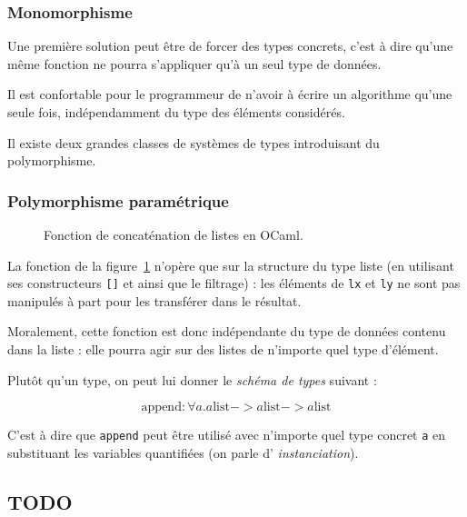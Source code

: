 \subsubsection{Monomorphisme}

Une première solution peut être de forcer des types concrets, c'est à dire
qu'une même fonction ne pourra s'appliquer qu'à un seul type de données.

Il est confortable pour le programmeur de n'avoir à écrire un algorithme qu'une
seule fois, indépendamment du type des éléments considérés.

Il existe deux grandes classes de systèmes de types introduisant du
polymorphisme.

\subsubsection{Polymorphisme paramétrique}

\cite{Milner78}

\cite{PascalNoEscape}

\begin{figure}
  \caption{Fonction de concaténation de listes en OCaml.}
  \label{fig:listappend}
\end{figure}

La fonction de la figure~\ref{fig:listappend} n'opère que sur la structure du type
liste (en utilisant ses constructeurs \texttt{{[}{]}} et \listcons ainsi que
le filtrage) : les éléments de \texttt{lx} et \texttt{ly} ne sont pas manipulés
à part pour les transférer dans le résultat.

Moralement, cette fonction est donc indépendante du type de données contenu dans
la liste : elle pourra agir sur des listes de n'importe quel type d'élément.

Plutôt qu'un type, on peut lui donner le \emph{schéma de types} suivant :

\[
  \textrm{append} : \forall a . a \textrm{list}
                             -> a \textrm{list}
                             -> a \textrm{list}
\]

C'est à dire que \texttt{append} peut être utilisé avec n'importe quel type
concret \texttt{a} en substituant les variables quantifiées (on parle d'
\emph{instanciation}).

\subsection*{TODO}


